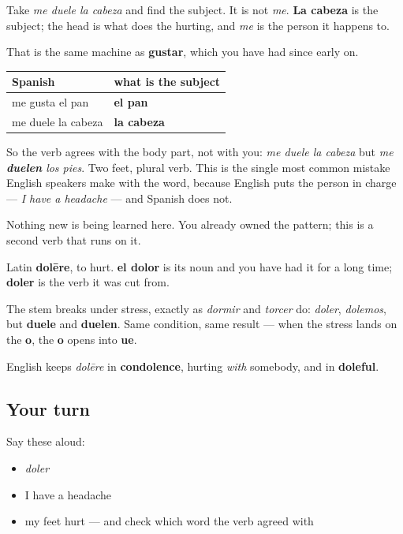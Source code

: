 \begin{grammarlens}[title={Grammar Lens: it is built like gustar}]
Take \emph{me duele la cabeza} and find the subject. It is not \emph{me}. \textbf{La cabeza} is the subject; the head is what does the hurting, and \emph{me} is the person it happens to.

That is the same machine as \textbf{gustar}, which you have had since early on.

\noindent
\begin{tabularx}{\linewidth}{@{}>{\raggedright\arraybackslash}X>{\raggedright\arraybackslash}X@{}}
\toprule
\textbf{Spanish} & \textbf{what is the subject} \\
\midrule
me gusta el pan & \textbf{el pan} \\
me duele la cabeza & \textbf{la cabeza} \\
\bottomrule
\end{tabularx}

So the verb agrees with the body part, not with you: \emph{me duele la cabeza} but \emph{me \textbf{duelen} los pies}. Two feet, plural verb. This is the single most common mistake English speakers make with the word, because English puts the person in charge — \emph{I have a headache} — and Spanish does not.

Nothing new is being learned here. You already owned the pattern; this is a second verb that runs on it.
\end{grammarlens}

\begin{cousinweb}
Latin \textbf{dolēre}, to hurt. \textbf{el dolor} is its noun and you have had it for a long time; \textbf{doler} is the verb it was cut from.

The stem breaks under stress, exactly as \emph{dormir} and \emph{torcer} do: \emph{doler}, \emph{dolemos}, but \textbf{duele} and \textbf{duelen}. Same condition, same result — when the stress lands on the \textbf{o}, the \textbf{o} opens into \textbf{ue}.

English keeps \emph{dolēre} in \textbf{condolence}, hurting \emph{with} somebody, and in \textbf{doleful}.
\end{cousinweb}

\subsection*{Your turn}
Say these aloud:

\begin{itemize}
\raggedright
  \item \emph{doler}
  \item I have a headache
  \item my feet hurt — and check which word the verb agreed with
\end{itemize}

